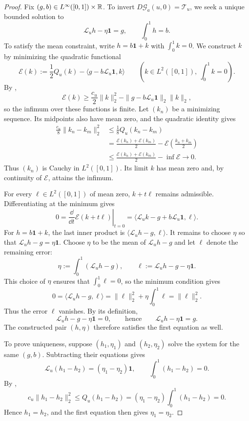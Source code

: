 \begin{proof}
Fix $(g,b)\in L^\infty([0,1])\times\mathbb R$. To invert
$D\mathcal G_a(u,0)=\mathcal T_u$, we seek a unique bounded solution to
\[
  \mathcal L_uh-\eta\mathbf1=g,\qquad \int_0^1h=b.
\]
To satisfy the mean constraint, write $h=b\mathbf1+k$ with $\int_0^1k=0$.
We construct $k$ by minimizing the quadratic functional
\[
  \mathcal E(k):=\frac12Q_u(k)-\langle g-b\mathcal L_u\mathbf1,k\rangle
  \qquad\left(k\in L^2([0,1]),\ \int_0^1k=0\right).
\]
By ,
\[
  \mathcal E(k)\ge\frac{c_u}{2}\|k\|_2^2
  -\|g-b\mathcal L_u\mathbf1\|_2\|k\|_2,
\]
so the infimum over these functions is finite. Let $(k_n)$ be a minimizing
sequence. Its midpoints also have mean zero, and the quadratic identity gives
\begin{align*}
  \frac{c_u}{8}\|k_n-k_m\|_2^2
  &\le\frac18Q_u(k_n-k_m)\\
  &=\frac{\mathcal E(k_n)+\mathcal E(k_m)}2
    -\mathcal E\left(\frac{k_n+k_m}2\right)\\
  &\le\frac{\mathcal E(k_n)+\mathcal E(k_m)}2
    -\inf\mathcal E\longrightarrow0.
\end{align*}
Thus $(k_n)$ is Cauchy in $L^2([0,1])$. Its limit $k$ has mean zero and,
by continuity of $\mathcal E$, attains the infimum.

For every $\ell\in L^2([0,1])$ of mean zero, $k+t\ell$ remains admissible.
Differentiating at the minimum gives
\[
  0=\left.\frac{\dd}{\dd t}\mathcal E(k+t\ell)\right|_{t=0}
  =\langle\mathcal L_uk-g+b\mathcal L_u\mathbf1,\ell\rangle.
\]
For $h=b\mathbf1+k$, the last inner product is
$\langle\mathcal L_uh-g,\ell\rangle$. It remains to choose $\eta$ so that
$\mathcal L_uh-g=\eta\mathbf1$. Choose $\eta$ to be the mean of
$\mathcal L_uh-g$ and let $\ell$ denote the remaining error:
\[
  \eta:=\int_0^1(\mathcal L_uh-g),
  \qquad \ell:=\mathcal L_uh-g-\eta\mathbf1.
\]
This choice of $\eta$ ensures that $\int_0^1\ell=0$, so the minimum condition gives
\[
  0=\langle\mathcal L_uh-g,\ell\rangle
  =\|\ell\|_2^2+\eta\int_0^1\ell=\|\ell\|_2^2.
\]
Thus the error $\ell$ vanishes. By its definition,
\[
  \mathcal L_uh-g-\eta\mathbf1=0,
  \qquad\text{hence}\qquad \mathcal L_uh-\eta\mathbf1=g.
\]
The constructed pair $(h,\eta)$ therefore satisfies the first equation as well.

To prove uniqueness, suppose $(h_1,\eta_1)$ and $(h_2,\eta_2)$ solve the
system for the same $(g,b)$. Subtracting their equations gives
\[
  \mathcal L_u(h_1-h_2)=(\eta_1-\eta_2)\mathbf1,
  \qquad \int_0^1(h_1-h_2)=0.
\]
By ,
\[
  c_u\|h_1-h_2\|_2^2\le Q_u(h_1-h_2)
  =(\eta_1-\eta_2)\int_0^1(h_1-h_2)=0.
\]
Hence $h_1=h_2$, and the first equation then gives $\eta_1=\eta_2$.


\end{proof}

